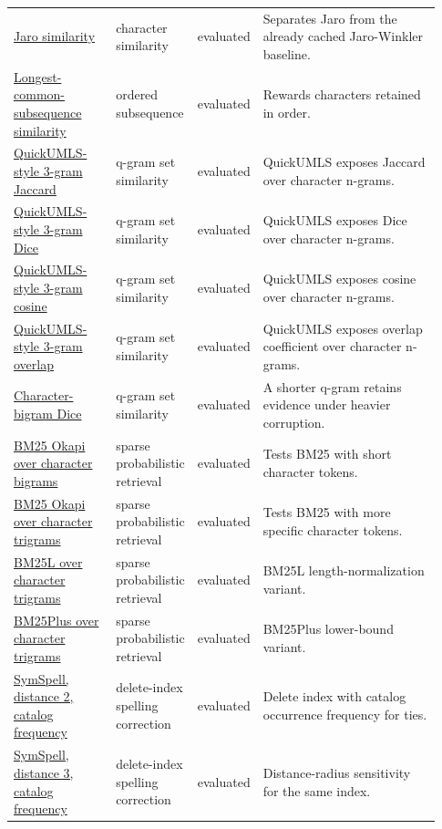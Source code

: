 \begin{landscape}
\begin{scriptsize}
\begin{longtable}{@{}L{0.24\linewidth}L{0.15\linewidth}L{0.12\linewidth}L{0.42\linewidth}@{}}
\href{https://github.com/rapidfuzz/RapidFuzz}{Jaro similarity} & character similarity & evaluated & Separates Jaro from the already cached Jaro-Winkler baseline. \\
\href{https://github.com/rapidfuzz/RapidFuzz}{Longest-common-subsequence similarity} & ordered subsequence & evaluated & Rewards characters retained in order. \\
\href{https://github.com/Georgetown-IR-Lab/QuickUMLS}{QuickUMLS-style 3-gram Jaccard} & q-gram set similarity & evaluated & QuickUMLS exposes Jaccard over character n-grams. \\
\href{https://github.com/Georgetown-IR-Lab/QuickUMLS}{QuickUMLS-style 3-gram Dice} & q-gram set similarity & evaluated & QuickUMLS exposes Dice over character n-grams. \\
\href{https://github.com/Georgetown-IR-Lab/QuickUMLS}{QuickUMLS-style 3-gram cosine} & q-gram set similarity & evaluated & QuickUMLS exposes cosine over character n-grams. \\
\href{https://github.com/Georgetown-IR-Lab/QuickUMLS}{QuickUMLS-style 3-gram overlap} & q-gram set similarity & evaluated & QuickUMLS exposes overlap coefficient over character n-grams. \\
\href{https://github.com/seamusabshere/fuzzy_match}{Character-bigram Dice} & q-gram set similarity & evaluated & A shorter q-gram retains evidence under heavier corruption. \\
\href{https://github.com/dorianbrown/rank_bm25}{BM25 Okapi over character bigrams} & sparse probabilistic retrieval & evaluated & Tests BM25 with short character tokens. \\
\href{https://github.com/dorianbrown/rank_bm25}{BM25 Okapi over character trigrams} & sparse probabilistic retrieval & evaluated & Tests BM25 with more specific character tokens. \\
\href{https://github.com/dorianbrown/rank_bm25}{BM25L over character trigrams} & sparse probabilistic retrieval & evaluated & BM25L length-normalization variant. \\
\href{https://github.com/dorianbrown/rank_bm25}{BM25Plus over character trigrams} & sparse probabilistic retrieval & evaluated & BM25Plus lower-bound variant. \\
\href{https://github.com/wolfgarbe/SymSpell}{SymSpell, distance 2, catalog frequency} & delete-index spelling correction & evaluated & Delete index with catalog occurrence frequency for ties. \\
\href{https://github.com/wolfgarbe/SymSpell}{SymSpell, distance 3, catalog frequency} & delete-index spelling correction & evaluated & Distance-radius sensitivity for the same index. \\

\end{longtable}
\end{scriptsize}
\end{landscape}

